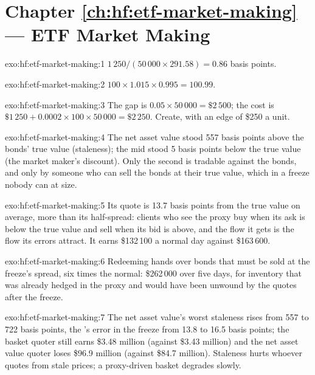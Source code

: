 \section*{Chapter \ref{ch:hf:etf-market-making} --- ETF Market Making}

\begin{solution}{exo:hf:etf-market-making:1}
$1\,250/(50\,000\times291.58)=0.86$ basis points.
\end{solution}

\begin{solution}{exo:hf:etf-market-making:2}
$100\times1.015\times0.995=100.99$.
\end{solution}

\begin{solution}{exo:hf:etf-market-making:3}
The gap is $0.05\times50\,000=\$2\,500$; the cost is $\$1\,250+0.0002\times100\times50\,000=\$2\,250$. Create, with an edge of \$250 a unit.
\end{solution}

\begin{solution}{exo:hf:etf-market-making:4}
The net asset value stood 557 basis points above the bonds' true value (staleness); the mid stood 5 basis points below the true value (the market
maker's discount). Only the second is tradable against the bonds, and only by someone who can sell the bonds at their true value, which in a freeze
nobody can at size.
\end{solution}

\begin{solution}{exo:hf:etf-market-making:5}
Its quote is 13.7 basis points from the true value on average, more than its half-spread: clients who see the proxy buy when its ask is below the
true value and sell when its bid is above, and the flow it gets is the flow its errors attract. It earns \$132\,100 a normal day against \$163\,600.
\end{solution}

\begin{solution}{exo:hf:etf-market-making:6}
Redeeming hands over bonds that must be sold at the freeze's spread, six times the normal: \$262\,000 over five days, for inventory that was already
hedged in the proxy and would have been unwound by the quotes after the freeze.
\end{solution}

\begin{solution}{exo:hf:etf-market-making:7}
The net asset value's worst staleness rises from 557 to 722 basis points, the 's error in the freeze from 13.8 to 16.5 basis points; the
basket quoter still earns \$3.48 million (against \$3.43 million) and the net asset value quoter loses \$96.9 million (against \$84.7 million). Staleness
hurts whoever quotes from stale prices; a proxy-driven basket degrades slowly.
\end{solution}

